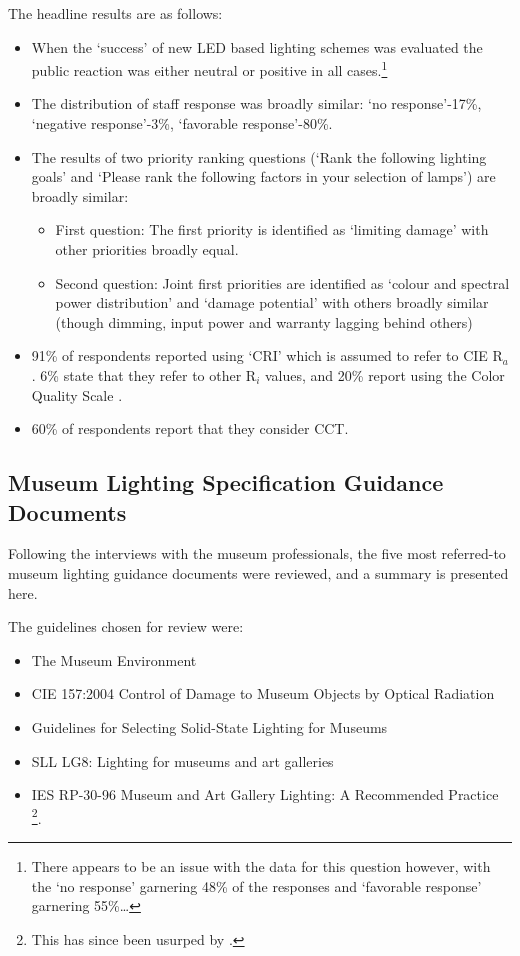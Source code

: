 \noindent
The headline results are as follows:
\begin{itemize}
    \item When the `success' of new \gls{LED} based lighting schemes was evaluated the public reaction was either neutral or positive in all cases.\footnote{There appears to be an issue with the data for this question however, with the `no response' garnering 48\% of the responses and `favorable response' garnering 55\%\dots}
    \item The distribution of staff response was broadly similar: `no response'-17\%, `negative response'-3\%, `favorable response'-80\%.
    \item The results of two priority ranking questions (`Rank the following lighting goals' and `Please rank the following factors in your selection of lamps') are broadly similar:
    \begin{itemize}
        \item First question: The first priority is identified as `limiting damage' with other priorities broadly equal.
        \item Second question: Joint first priorities are identified as `colour and spectral power distribution' and `damage potential' with others broadly similar (though dimming, input power and warranty lagging behind others)
    \end{itemize}
    \item 91\% of respondents reported using `\gls{CRI}' which is assumed to refer to \gls{CIE} R$_a$. 6\% state that they refer to other R$_i$ values, and 20\% report using the Color Quality Scale \citep{ohno_rationale_2010,davis_color_2010}.
    \item 60\% of respondents report that they consider \gls{CCT}.
\end{itemize} 

\subsection{Museum Lighting Specification Guidance Documents}

Following the interviews with the museum professionals, the five most referred-to museum lighting guidance documents were reviewed, and a summary is presented here.

\noindent
The guidelines chosen for review were:
\begin{itemize}
\item The Museum Environment \citep{thomson_museum_1986}
\item \gls{CIE} 157:2004 Control of Damage to Museum Objects by Optical Radiation \citep{cie_cie_2004}
\item Guidelines for Selecting Solid-State Lighting for Museums \citep{druzik_guidelines_2012}
\item SLL LG8: Lighting for museums and art galleries \citep{cibse_lighting_2015}
\item IES RP-30-96 Museum and Art Gallery Lighting: A Recommended Practice \citep{ies_ies_1996}\footnote{This has since been usurped by \citet{illuminating_engineering_society_ies_2017}.}.
\end{itemize}

